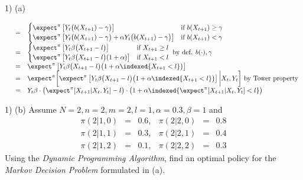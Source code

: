 \documentclass[11pt,a4paper]{article}
\begin{document}
\begin{answer}{1) (a)}
\begin{itemize}
\[\begin{array}{rcl}
      &=&\begin{cases}
        \expect^\pi\left[Y_t\big(b(X_{t+1})-\gamma\big)\right]&\text{if }b(X_{t+1})\geq\gamma\\
        \expect^\pi\left[Y_t\big(b(X_{t+1})-\gamma\big)+\alpha Y_t\big(b(X_{t+1})-\gamma\big)\right]&\text{if }b(X_{t+1})<\gamma
      \end{cases}\\
      &=&\begin{cases}
        \expect^\pi\left[Y_t\beta\big(X_{t+1}-l\big)\right]&\text{if }X_{t+1}\geq l\\
        \expect^\pi\left[Y_t\beta\big(X_{t+1}-l\big)(1+\alpha)\right]&\text{if }X_{t+1}<l
      \end{cases}\text{ by def. }b(\cdot),\gamma\\
      &=&\expect^\pi\left[Y_t\beta\big(X_{t+1}-l\big)\big(1+\alpha\indexed\{X_{t+1}<l\}\big)\right]\\
      &=&\expect^\pi\bigg[\expect^\pi\left[Y_t\beta\big(X_{t+1}-l\big)\big(1+\alpha\indexed\{X_{t+1}<l\}\big)\right]\bigg|X_t,Y_t\bigg]\text{ by Tower property}\\
      &=&Y_t\beta\cdot\big(\expect^\pi[X_{t+1}|X_t,Y_t]-l\big)\cdot\big(1+\alpha\indexed\{\expect^\pi[X_{t+1}|X_t,Y_t]<l\}\big)
    \end{array}\]
  \end{itemize}
\end{answer}

\begin{question}{1) (b)}
  Assume $N=2,n=2,m=2,l=1,\alpha=0.3,\beta=1$ and
  \[\begin{array}{rclrcl}
    \pi(2|1,0)&=&0.6,&\pi(2|2,0)&=&0.8\\
    \pi(2|1,1)&=&0.3,&\pi(2|2,1)&=&0.4\\
    \pi(2|1,2)&=&0.1,&\pi(2|2,2)&=&0.3
  \end{array}\]
  Using the \textit{Dynamic Programming Algorithm}, find an optimal policy for the \textit{Markov Decision Problem} formulated in (a).
\end{question}
\end{document}
